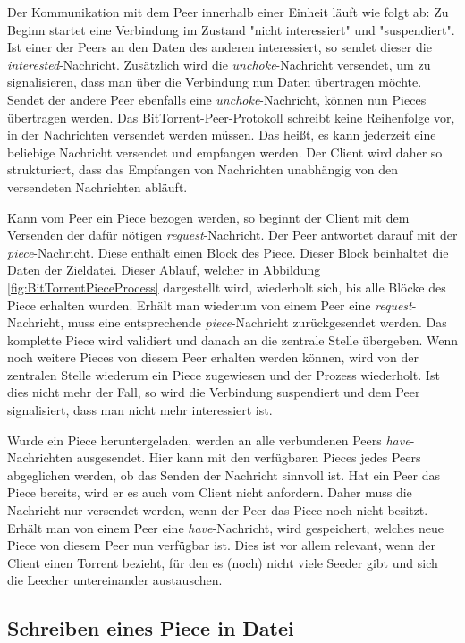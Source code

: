 Der Kommunikation mit dem Peer innerhalb einer Einheit läuft wie folgt ab: 
Zu Beginn startet eine Verbindung im Zustand "nicht interessiert" und "suspendiert". Ist einer der Peers an den Daten des anderen interessiert, so sendet dieser die \emph{interested}-Nachricht. Zusätzlich wird die \emph{unchoke}-Nachricht versendet, um zu signalisieren, dass man über die Verbindung nun Daten übertragen möchte. Sendet der andere Peer ebenfalls eine \emph{unchoke}-Nachricht, können nun Pieces übertragen werden. Das BitTorrent-Peer-Protokoll schreibt keine Reihenfolge vor, in der Nachrichten versendet werden müssen. Das heißt, es kann jederzeit eine beliebige Nachricht versendet und empfangen werden. Der Client wird daher so strukturiert, dass das Empfangen von Nachrichten unabhängig von den versendeten Nachrichten abläuft. 

Kann vom Peer ein Piece bezogen werden, so beginnt der Client mit dem Versenden der dafür nötigen \emph{request}-Nachricht. Der Peer antwortet darauf mit der \emph{piece}-Nachricht. Diese enthält einen Block des Piece. Dieser Block beinhaltet die Daten der Zieldatei. Dieser Ablauf, welcher in Abbildung \ref{fig:BitTorrentPieceProcess} dargestellt wird, wiederholt sich, bis alle Blöcke des Piece erhalten wurden. Erhält man wiederum von einem Peer eine \emph{request}-Nachricht, muss  eine entsprechende \emph{piece}-Nachricht zurückgesendet werden. Das komplette Piece wird validiert und danach an die zentrale Stelle übergeben. Wenn noch weitere Pieces von diesem Peer erhalten werden können, wird von der zentralen Stelle wiederum ein Piece zugewiesen und der Prozess wiederholt. Ist dies nicht mehr der Fall, so wird die Verbindung suspendiert und dem Peer signalisiert, dass man nicht mehr interessiert ist.


Wurde ein Piece heruntergeladen, werden an alle verbundenen Peers \emph{have}-Nach\-richten ausgesendet. Hier kann mit den verfügbaren Pieces jedes Peers abgeglichen werden, ob das Senden der Nachricht sinnvoll ist. Hat ein Peer das Piece bereits, wird er es auch vom Client nicht anfordern. Daher muss die Nachricht nur versendet werden, wenn der Peer das Piece noch nicht besitzt. Erhält man von einem Peer eine \emph{have}-Nachricht, wird gespeichert, welches neue Piece von diesem Peer nun verfügbar ist. Dies ist vor allem relevant, wenn der Client einen Torrent bezieht, für den es (noch) nicht viele Seeder gibt und sich die Leecher untereinander austauschen.

\subsection{Schreiben eines Piece in Datei}

